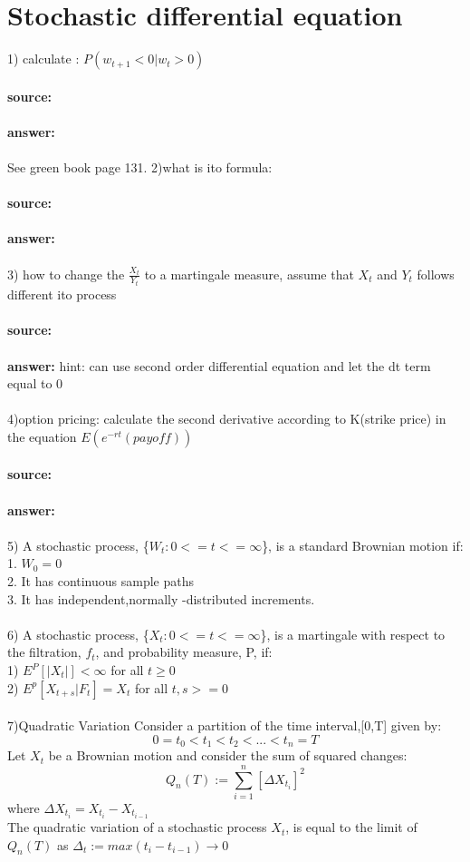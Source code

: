 \documentclass[11pt,fleqn]{book} %
\begin{document}
\section{Stochastic differential equation}
1) calculate : $P(w_{t+1}<0|w_t>0)$ \\\\
\textbf{source:} \\\\
\textbf{answer:} \\\\
See green book page 131.
2)what is ito formula: \\\\
\textbf{source:} \\\\
\textbf{answer:} \\\\
{\color{red}3) how to change the $\frac{X_t}{Y_t}$ to a martingale measure, assume that $X_t$ and $Y_t$ follows different ito process} \\\\
\textbf{source:} \\\\
\textbf{answer:} hint: can use second order differential equation and let the dt term equal to 0\\\\
{\color{red}4)option pricing: calculate the second derivative according to K(strike price) in the equation $E(e^{-rt}(payoff))$} \\\\
\textbf{source:} \\\\
\textbf{answer:} \\\\
5) A stochastic process, \{$W_t:0<=t<=\infty$\}, is a standard Brownian motion if:\\
1. $W_0=0$\\
2. It has continuous sample paths\\
3. It has independent,normally -distributed increments.\\\\
6) A stochastic process, \{$X_t:0<=t<=\infty$\}, is a martingale with respect to the filtration, $f_t$, and probability measure, P, if:\\
1) $E^P[|X_t|]<\infty$ for all $t\geq 0$\\
2) $E^p[X_{t+s}|F_t]=X_t$ for all $t,s >=0$\\\\
7)Quadratic Variation
Consider a partition of the time interval,[0,T] given by:\\
$$0=t_0<t_1<t_2<...<t_n=T$$
Let $X_t$ be a Brownian motion and consider the sum of squared changes:\\
$$Q_n(T):=\sum_{i=1}^n[\Delta X_{t_i}]^2$$
where $\Delta X_{t_i}=X_{t_i}-X_{t_{i-1}}$ \\
The quadratic variation of a stochastic process $X_t$, is equal to the limit of $Q_n(T)$ as $\Delta_t:= max(t_i-t_{i-1})\rightarrow 0$
\end{document}

